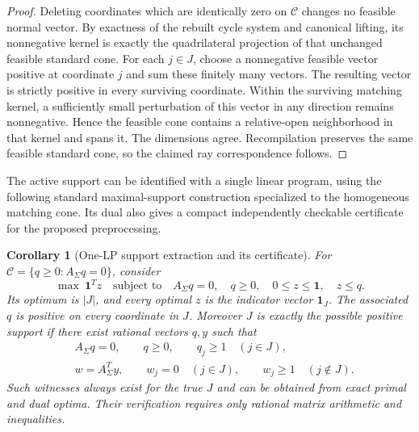 \documentclass[11pt,letterpaper]{article}
\newtheorem{corollary}[theorem]{Corollary}
\theoremstyle{definition}
\theoremstyle{remark}\newtheorem{remark}[theorem]{Remark}
\newcommand{\cone}{\mathcal C}\newcommand{\stdcone}{\mathcal S}
\begin{document}
\begin{proof}
Deleting coordinates which are identically zero on $\cone$ changes no
feasible normal vector. By exactness of the rebuilt cycle system and
canonical lifting, its nonnegative kernel is exactly the quadrilateral
projection of that unchanged feasible standard cone. For each $j\in J$,
choose a nonnegative feasible
vector positive at coordinate $j$ and sum these finitely many vectors.
The resulting vector is strictly positive in every surviving coordinate.
Within the surviving matching kernel, a sufficiently small perturbation
of this vector in any direction remains nonnegative. Hence the feasible
cone contains a relative-open neighborhood in that kernel and spans it.
The dimensions agree. Recompilation preserves the same feasible standard
cone, so the claimed ray correspondence follows.
\end{proof}

The active support can be identified with a single linear program,
using the following standard maximal-support construction specialized
to the homogeneous matching cone. Its dual also gives a compact
independently checkable certificate for the proposed preprocessing.

\begin{corollary}[One-LP support extraction and its certificate]
\label{cor:oneLP}
For $\cone=\{q\ge0:A_\Sigma q=0\}$, consider
\begin{equation}
 \max\ \mathbf1^Tz\quad\text{subject to}\quad
 A_\Sigma q=0,\quad q\ge0,\quad 0\le z\le\mathbf1,\quad z\le q.
 \label{eq:supportLP}
\end{equation}
Its optimum is $|J|$, and every optimal $z$ is the indicator vector
$\mathbf1_J$. The associated $q$ is positive on every coordinate in $J$.
Moreover $J$ is exactly the possible positive support if there exist
rational vectors $q,y$ such that
\begin{align*}
 &A_\Sigma q=0,\qquad q\ge0,\qquad q_j\ge1\quad(j\in J),\\
 &w=A_\Sigma^Ty,\qquad w_j=0\quad(j\in J),\qquad
 w_j\ge1\quad(j\notin J).
\end{align*}
Such witnesses always exist for the true $J$ and can be obtained from
exact primal and dual optima. Their verification requires only rational
matrix arithmetic and inequalities.
\end{corollary}
\end{document}

